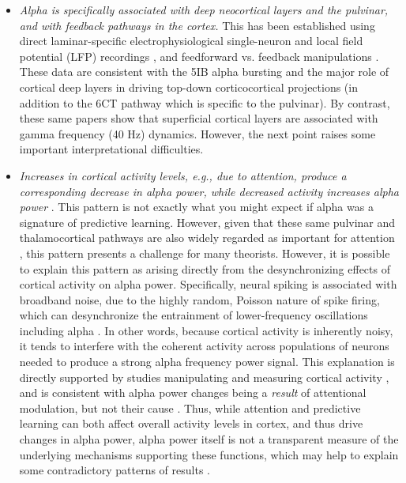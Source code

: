 \documentclass[11pt,twoside]{article}
\newif\myifpdf
\begin{document}
\begin{itemize}
	\item \emph{Alpha is specifically associated with deep neocortical layers and the pulvinar, and with feedback pathways in the cortex.}  This has been established using direct laminar-specific electrophysiological single-neuron and local field potential (LFP) recordings \citep{LuczakBarthoHarris13,BuffaloFriesLandmanEtAl11,MaierAdamsAuraEtAl10,MaierAuraLeopold11,SpaakBonnefondMaierEtAl12,XingYehBurnsEtAl12}, and feedforward vs. feedback manipulations \citep{vonSteinChiangKonig00,vanKerkoerleSelfDagninoEtAl14,BastosVezoliBosmanEtAl15,JensenBonnefondMarshallEtAl15,MichalareasVezolivanPeltEtAl16}.  	These data are consistent with the 5IB alpha bursting and the major role of cortical deep layers in driving top-down corticocortical projections (in addition to the 6CT pathway which is specific to the pulvinar).  By contrast, these same papers show that superficial cortical layers are associated with gamma frequency (40 Hz) dynamics.  However, the next point raises some important interpretational difficulties.

	\item \emph{Increases in cortical activity levels, e.g., due to attention, produce a corresponding decrease in alpha power, while decreased activity increases alpha power}  \citep{WordenFoxeWangEtAl00,KellyLalorReillyEtAl06,KlimeschSausengHanslmayr07,FriesWomelsdorfOostenveldEtAl08,JensenMazaheri10,FosterAwh19}. This pattern is not exactly what you might expect if alpha was a signature of predictive learning.  However, given that these same pulvinar and thalamocortical pathways are also widely regarded as important for attention \citep{LaBergeBuchsbaum90,BenderYouakim01,SnowAllenRafalEtAl09,SaalmannKastner11,ZhouSchaferDesimone16,FiebelkornKastner19}, this pattern presents a challenge for many theorists.  However, it is possible to explain this pattern as arising directly from the desynchronizing effects of cortical activity on alpha power.  Specifically, neural spiking is associated with broadband noise, due to the highly random, Poisson nature of spike firing, which can desynchronize the entrainment of lower-frequency oscillations including alpha \citep{WaldertLemonKraskov13,RayMaunsell11,PrivmanMalachYeshurun13,SolomonKragelSperlingEtAl17}.  In other words, because cortical activity is inherently noisy, it tends to interfere with the coherent activity across populations of neurons needed to produce a strong alpha frequency power signal.  This explanation is directly supported by studies manipulating and measuring cortical activity \citep{ZhouSchaferDesimone16,FriesWomelsdorfOostenveldEtAl08}, and is consistent with alpha power changes being a \emph{result} of attentional modulation, but not their cause \citep{AntonovChakravarthiAndersen20}.  Thus, while attention and predictive learning can both affect overall activity levels in cortex, and thus drive changes in alpha power, alpha power itself is not a transparent measure of the underlying mechanisms supporting these functions, which may help to explain some contradictory patterns of results \citep{FosterAwh19,GundlachMorattiForschackEtAl20,KeitelKeitelBenwellEtAl19}.


\end{itemize}
\end{document}
